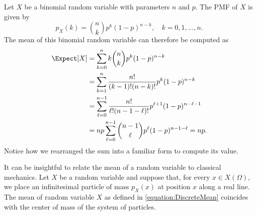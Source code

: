 \begin{example}
Let $X$ be a binomial random variable with parameters $n$ and $p$.
The PMF of $X$ is given by
\begin{equation*}
p_X (k) = \binom{n}{k} p^k (1-p)^{n-k}, \quad k = 0, 1, \ldots, n.
\end{equation*}
The mean of this binomial random variable can therefore be computed as
\begin{equation*}
\begin{split}
\Expect [X] &= \sum_{k=0}^n k \binom{n}{k} p^k (1-p)^{n-k} \\
&= \sum_{k=1}^n \frac{n!}{(k-1)!(n-k)!} p^k (1-p)^{n-k} \\
&= \sum_{\ell=0}^{n-1} \frac{n!}{\ell!(n-1-\ell)!} p^{\ell+1} (1-p)^{n-\ell-1} \\
&= n p \sum_{\ell=0}^{n-1} \binom{n-1}{\ell} p^{\ell} (1-p)^{n-1-\ell}
= n p .
\end{split}
\end{equation*}
Notice how we rearranged the sum into a familiar form to compute its value.
\end{example}

It can be insightful to relate the mean of a random variable to classical mechanics.
Let $X$ be a random variable and suppose that, for every $x \in X(\Omega)$, we place an infinitesimal particle of mass $p_X(x)$ at position $x$ along a real line.
The mean of random variable $X$ as defined in \eqref{equation:DiscreteMean} coincides with the center of mass of the system of particles.

